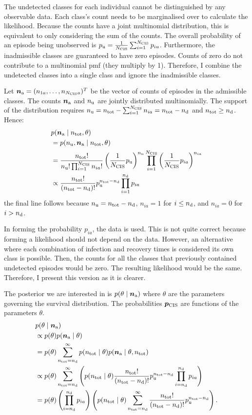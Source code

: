 \documentclass[thesis.tex]{subfiles}
\begin{document}
The undetected classes for each individual cannot be distinguished by any observable data.
Each class's count needs to be marginalised over to calculate the likelihood.
Because the counts have a joint multinomial distribution, this is equivalent to only considering the sum of the counts.
The overall probability of an episode being unobserved is $p_\text{u} = \frac{1}{N_\text{CIS}} \sum_{i=1}^{N_\text{CIS}} p_{iu}$.
Furthermore, the inadmissible classes are guaranteed to have zero episodes.
Counts of zero do not contribute to a multinomial pmf (they multiply by 1).
Therefore, I combine the undetected classes into a single class and ignore the inadmissible classes.

Let $\bm{n_\text{a}} = (n_{1a}, \dots, n_{N_\text{CIS} a})^T$ be the vector of counts of episodes in the admissible classes.
The counts $\bm{n_\text{a}}$ and $n_\text{u}$ are jointly distributed multinomially.
The support of the distribution requires $n_\text{u} = n_\text{tot} - \sum_{i=1}^{N_\text{CIS}} n_{ia} = n_\text{tot} - n_\text{d}$ and $n_\text{tot} \geq n_\text{d}$.
Hence:
\begin{align}
&p(\bm{n_\text{a}} \mid n_\text{tot}, \theta) \\
&= p(n_\text{u}, \bm{n_\text{a}}\mid n_\text{tot}, \theta) \\
&= \frac{n_\text{tot}!}{n_\text{u}! \prod_{i=1}^{N_\text{CIS}} n_{ia}!}  \left(\frac{1}{N_\text{CIS}}p_\text{u}\right)^{n_\text{u}}\prod_{i=1}^{N_\text{CIS}} \left(\frac{1}{N_\text{CIS}}p_{ia}\right)^{n_{ia}} \\
&\propto \frac{n_\text{tot}!}{(n_\text{tot} - n_\text{d})!} p_\text{u}^{n_\text{tot} - n_\text{d}} \prod_{i=1}^{n_\text{d}} p_{ia} \label{perf-test:eq:augmented-likelihood}
\end{align}
the final line follows because $n_\text{u} = n_\text{tot} - n_\text{d}$, $n_{ia} = 1$ for $i \leq n_\text{d}$, and $n_{ia} = 0$ for $i > n_\text{d}$.

In forming the probability $p_{ia}$, the data is used.
This is not quite correct because forming a likelihood should not depend on the data.
However, an alternative where each combination of infection and recovery times is considered its own class is possible.
Then, the counts for all the classes that previously contained undetected episodes would be zero.
The resulting likelihood would be the same.
Therefore, I present this version as it is clearer.

The posterior we are interested in is $p(\theta \mid \bm{n_\text{a}})$ where $\theta$ are the parameters governing the survival distribution.
The probabilities $\bm{p_\text{CIS}}$ are functions of the parameters $\theta$.
\begin{align}
&p(\theta \mid \bm{n_\text{a}}) \\
&\propto p(\theta) p(\bm{n_\text{a}} \mid \theta) \\
&= p(\theta) \sum_{n_\text{tot}=n_\text{d}}^\infty p(n_\text{tot} \mid \theta) p(\bm{n_\text{a}} \mid \theta, n_\text{tot}) \\
&\propto p(\theta) \sum_{n_\text{tot}=n_\text{d}}^\infty \left( p(n_\text{tot} \mid \theta) \frac{n_\text{tot}!}{(n_\text{tot} - n_\text{d})!} p_\text{u}^{n_\text{tot} - n_\text{d}} \prod_{i=n_\text{d}}^{n_\text{d}} p_{ia} \right) \\
&= p(\theta) \left( \prod_{i=n_\text{d}}^{n_\text{d}} p_{ia} \right) \left( p(n_\text{tot} \mid \theta) \sum_{n_\text{tot}=n_\text{d}}^\infty \frac{n_\text{tot}!}{(n_\text{tot} - n_\text{d})!} p_\text{u}^{n_\text{tot} - n_\text{d}} \right) \label{perf-test:eq:full-posterior}.
\end{align}
\end{document}
